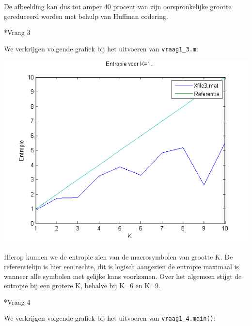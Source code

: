 \documentclass[]{article}
\begin{document}
\begin{section}
\begin{subsection}
        De afbeelding kan dus tot amper 40 procent van zijn
        oorspronkelijke grootte gereduceerd worden met behulp van
        Huffman codering.

    \end{subsection}

    \begin{subsection}*{Vraag 3}

        We verkrijgen volgende grafiek bij het uitvoeren van
        \texttt{vraag1\_3.m}:

        \includegraphics{vraag1_3.png}

        Hierop kunnen we de entropie zien van de macrosymbolen van
        grootte K. De referentielijn is hier een rechte, dit is logisch
        aangezien de entropie maximaal is wanneer alle symbolen met
        gelijke kans voorkomen.
        Over het algemeen stijgt de entropie bij een grotere K, behalve bij K=6 en K=9.

    \end{subsection}

    \begin{subsection}*{Vraag 4}

        We verkrijgen volgende grafiek bij het uitvoeren van
        \texttt{vraag1\_4.main()}:


\end{subsection}
\end{section}
\end{document}
